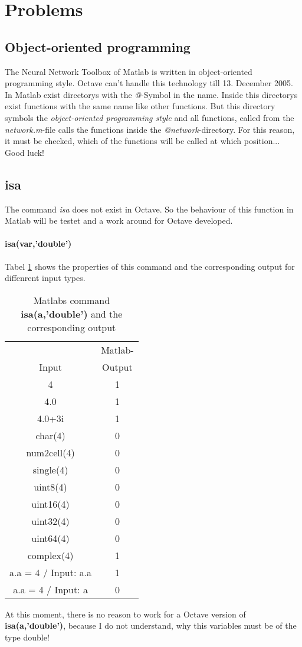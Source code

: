 \section{Problems}
\subsection{Object-oriented programming}
The Neural Network Toolbox of Matlab is written in object-oriented programming style.
Octave can't handle this technology till 13. December 2005. In Matlab exist directorys with
the \textit{@}-Symbol in the name. Inside this directorys exist functions with the same name like
other functions. But this directory symbols the \textit{object-oriented programming style} and all
functions, called from the \textit{network.m}-file calls the functions inside the \textit{@network}-directory.
For this reason, it must be checked, which of the functions will be called at which position...\\
Good luck!

\subsection{isa}
The command \textit{isa} does not exist in Octave. So the behaviour of this function in Matlab will be testet and a work around for Octave developed.

\paragraph{isa(var,'double')}
Tabel \ref{tab:isaDouble} shows the properties of this command and the corresponding output for diffenrent input types.
\begin{table}
	\centering
	\begin{tabular}{c c}
		\toprule
																						& Matlab- \\
									 Input										& Output\\
		\midrule
  								 4 										  	  & 1 \\
									 4.0  										  &	1 \\
									 4.0+3i 										& 1 \\
									 char(4) 										& 0 \\
									 num2cell(4) 								& 0 \\
									 single(4)									& 0 \\
									 uint8(4) 									& 0\\
									 uint16(4)									&  0\\
									 uint32(4) 									& 0 \\ 
									 uint64(4) 									& 0 \\ 
									 complex(4) 								& 1 \\
									 a.a = 4 / Input: a.a  			& 1 \\
									 a.a = 4 / Input: a   			& 0 \\
		\bottomrule
	\end{tabular}
	\caption{Matlabs command \textbf{isa(a,'double')} and the corresponding output}
	\label{tab:isaDouble}
\end{table}

At this moment, there is no reason to work for a Octave version of \textbf{isa(a,'double')}, because I do not understand, why this variables must be of the type double!
